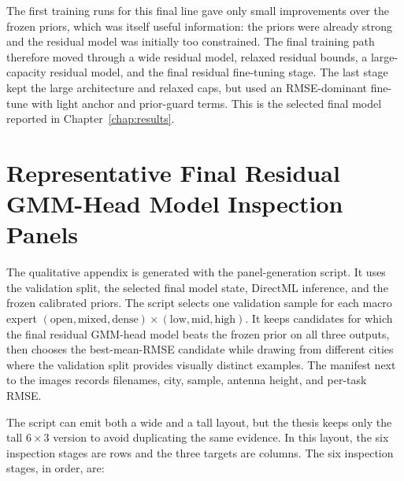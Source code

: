 The first training runs for this final line gave only small improvements over the frozen
priors, which was itself useful information: the priors were already strong
and the residual model was initially too constrained. The final training path
therefore moved through a wide residual model, relaxed residual bounds, a
large-capacity residual model, and the final residual fine-tuning stage. The
last stage kept the large architecture and relaxed caps, but used an
RMSE-dominant fine-tune with light anchor and prior-guard terms. This is the
selected final model reported in Chapter~\ref{chap:results}.

\chapter{Representative Final Residual GMM-Head Model Inspection Panels}

The qualitative appendix is generated with the panel-generation script. It uses
the validation split, the selected final model state, DirectML
inference, and the frozen calibrated priors. The script selects one validation
sample for each macro expert
\((\mathrm{open},\mathrm{mixed},\mathrm{dense})\times
(\mathrm{low},\mathrm{mid},\mathrm{high})\). It keeps candidates for which
the final residual GMM-head model beats the frozen prior on all three outputs, then chooses the
best-mean-RMSE candidate while drawing from different cities where the
validation split provides visually distinct examples. The manifest next to
the images records filenames, city, sample, antenna height, and per-task RMSE.

The script can emit both a wide and a tall layout, but the thesis keeps only
the tall \(6\times 3\) version to avoid duplicating the same evidence. In this
layout, the six inspection stages are rows and the three targets are columns.
The six inspection stages, in order, are:


